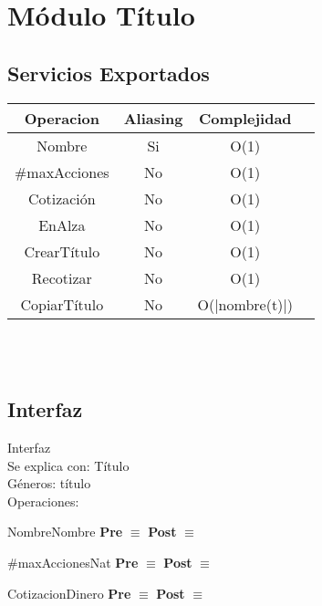 \section{M\'odulo T\'itulo}

\subsection{Servicios Exportados}

\begin{tabular}[c]{|c|c|c|c|}
	
	\hline
		Operacion & Aliasing & Complejidad \\
		\hline
		Nombre & Si & O(1)  \\
		\hline
		\#maxAcciones & No & O(1) \\
		\hline
		Cotizaci\'on & No & O(1)\\
		\hline
		EnAlza & No & O(1)\\
		\hline
		CrearT\'itulo & No & O(1)\\
		\hline
		Recotizar & No & O(1)\\
		\hline
		CopiarT\'itulo & No & O(|nombre(t)|)\\
		\hline
	\end{tabular}\\\\



\subsection{Interfaz}
	Interfaz \\
	Se explica con: T\'itulo \\
	G\'{e}neros: t\'itulo \\
	Operaciones:\\
	
	
	\begin{interfaz}{Nombre}{}{Nombre}{}
	\textbf{Pre} $\equiv$  
	\textbf{Post} $\equiv$ 
	\end{interfaz}

	\begin{interfaz}{\#maxAcciones}{}{Nat}{}
	\textbf{Pre} $\equiv$  
	\textbf{Post} $\equiv$ 
	\end{interfaz}

	\begin{interfaz}{Cotizacion}{}{Dinero}{}
	\textbf{Pre} $\equiv$  
	\textbf{Post} $\equiv$ 
	\end{interfaz}

